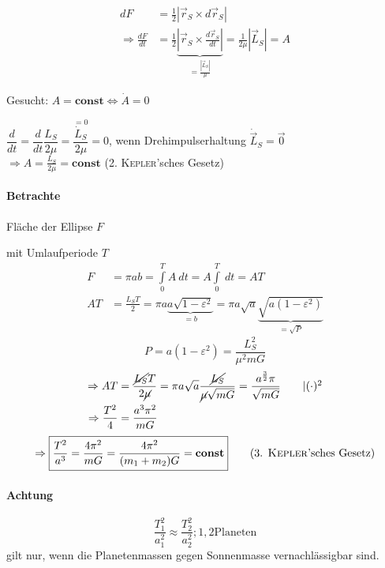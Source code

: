 \begin{align*}
    dF &= \frac{1}{2} | \vec r_S \times d \vec r_S | \tag*{$| \cdot dt$} \\
    \Rightarrow \frac{dF}{dt} &= \frac{1}{2} \underbrace{\left| \vec r_S \times \frac{d\vec r_S}{dt}\right|}_{= \frac{|\vec L_S|}{\mu}} = \frac{1}{2\mu} | \vec L_S | = A
\end{align*}

Gesucht: $A = \mathbf{const} \Leftrightarrow \dot A = 0$
\begin{center}
    $\dfrac{d}{dt} = \dfrac{d}{dt} \dfrac{L_S}{2 \mu} = \dfrac{\overset{= 0}{\dot L_S}}{2 \mu} = 0$, wenn Drehimpulserhaltung $\dot{\vec{L}}_S = \vec 0$ \\
    $\Rightarrow \boxed{A = \frac{L_S}{2\mu} = \mathbf{const}}$ (2. \textsc{Kepler}'sches Gesetz)
\end{center}

\paragraph{Betrachte} Fläche der Ellipse $F$

mit Umlaufperiode $T$
\begin{align*}
    F &= \pi a b = \int\limits_0^T A\ dt = A \int\limits_0^T\ dt = AT\\
    AT &= \frac{L_ST}{2} = \pi a \underbrace{a \sqrt{1 - \varepsilon^2}}_{= b} = \pi a \sqrt a \underbrace{\sqrt{a (1 - \varepsilon^2)}}_{= \sqrt{P}}
\end{align*}
\[ \boxed{P = a(1-\varepsilon^2) = \frac{L_S^2}{\mu^2 m G}} \]
\begin{align*}
    \Rightarrow AT &= \frac{\cancel{L_S}T}{2 \cancel{\mu}} = \pi a \sqrt{a} \frac{\cancel{L_S}}{\cancel{\mu} \sqrt{mG}} = \frac{a^{\frac{3}{2}} \pi}{\sqrt{mG}} \tag*{$| (\cdot)^2$}\\
    \Rightarrow \frac{T^2}{4} &= \frac{a^3\pi^2}{m G} \\
\end{align*}
\[ \Rightarrow \boxed{\frac{T^2}{a^3} = \frac{4\pi^2}{mG} = \frac{4 \pi^2}{(m_1 + m_2) G} = \mathbf{const}} \tag{3. \textsc{Kepler}'sches Gesetz} \]

\paragraph{Achtung} \[\frac{T_1^2}{a_1^2} \approx \frac{T_2^2}{a_2^2}; 1, 2 \text{Planeten}\]
gilt nur, wenn die Planetenmassen gegen Sonnenmasse vernachlässigbar sind.

